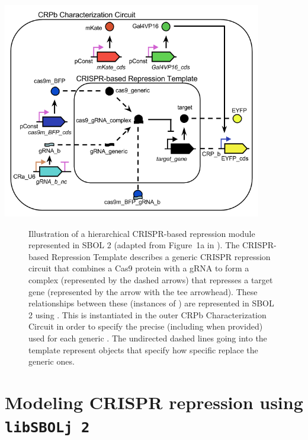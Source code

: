 \begin{center}
  \includegraphics[width=0.85\textwidth]{figures/crispr_repression2} 
\end{center}

\begin{figure}[tbph]
\caption{\label{fig:fig-CRPb} Illustration of a hierarchical CRISPR-based repression module represented in SBOL 2 (adapted from Figure~1a in \cite{kiani2014crispr}). The CRISPR-based Repression Template  describes a generic CRISPR repression circuit that combines a Cas9 protein with a gRNA to form a complex (represented by the dashed arrows) that represses a target gene (represented by the arrow with the tee arrowhead).  These relationships between these  (instances of ) are represented in SBOL 2 using .  This  is instantiated in the outer CRPb Characterization Circuit  in order to specify the precise (including  when provided)   used for each generic . The undirected dashed lines going into the template  represent  objects that specify how specific  replace the generic ones.}
\end{figure}
\newpage
\section*{Modeling CRISPR repression using {\tt libSBOLj 2}}

